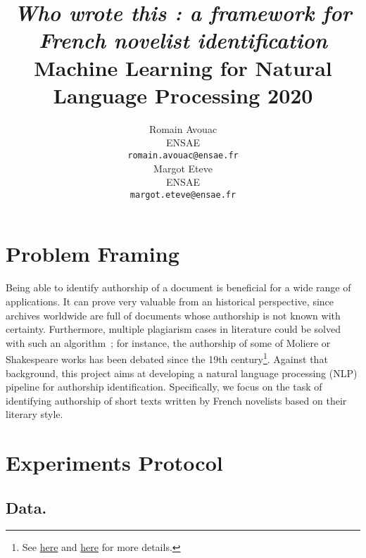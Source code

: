 \documentclass[11pt,a4paper]{article}
\title{\textit{Who wrote this : a framework for French novelist identification} \\
Machine Learning for Natural Language Processing 2020}
\author{Romain Avouac \\
  ENSAE  \\
  \texttt{romain.avouac@ensae.fr} \\\And
  Margot Eteve \\
  ENSAE \\
  \texttt{margot.eteve@ensae.fr} \\}
\date{}
\begin{document}
\maketitle

\section{Problem Framing}

Being able to identify authorship of a document is beneficial for a wide range of applications. It can prove very valuable from an historical perspective, since archives worldwide are full of documents whose authorship is not known with certainty. Furthermore, multiple plagiarism cases in literature could be solved with such an algorithm~; for instance, the authorship of some of Moliere or Shakespeare works has been debated since the 19th century\footnote{See \href{https://en.wikipedia.org/wiki/Moli\%C3\%A8re_authorship_question}{here} and \href{https://en.wikipedia.org/wiki/Shakespeare_authorship_question}{here} for more details.}. Against that background, this project aims at developing a natural language processing (NLP) pipeline for authorship identification. Specifically, we focus on the task of identifying authorship of short texts written by French novelists based on their literary style.

\section{Experiments Protocol}

\subsection{Data.} 
\end{document}
